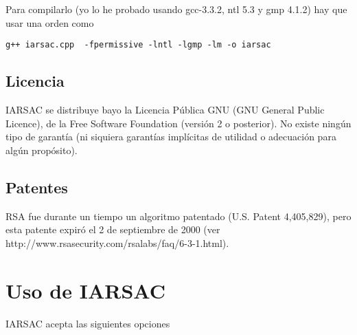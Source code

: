 \documentclass[spanish]{article}
\begin{document}
Para compilarlo (yo lo he probado usando gcc-3.3.2, ntl 5.3 y gmp 4.1.2) 
hay que usar una orden como

\begin{verbatim}
g++ iarsac.cpp  -fpermissive -lntl -lgmp -lm -o iarsac 
\end{verbatim}

\subsection*{Licencia}

IARSAC se distribuye bayo la Licencia Pública GNU (GNU General Public
Licence), de la Free Software Foundation (versión 2 o posterior).
No existe ningún tipo de garantía (ni siquiera garantías implícitas
de utilidad o adecuación para algún propósito).

\subsection*{Patentes }

RSA fue durante un tiempo un algoritmo patentado (U.S. Patent 4,405,829),
pero esta patente expiró el 2 de septiembre de 2000 (ver 
{http://www.rsasecurity.com/rsalabs/faq/6-3-1.html}).

\section{Uso de IARSAC}

IARSAC acepta las siguientes opciones
\end{document}
